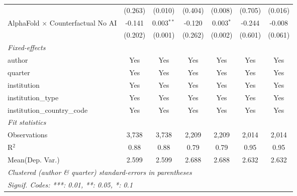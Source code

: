 \begin{tabular}{lcccccc}
                                            & (0.263) & (0.010)        & (0.404) & (0.008)        & (0.705) & (0.016)\\   
   AlphaFold $\times$ Counterfactual No AI  & -0.141  & 0.003$^{**}$   & -0.120  & 0.003$^{*}$    & -0.244  & -0.008\\   
                                            & (0.202) & (0.001)        & (0.262) & (0.002)        & (0.601) & (0.061)\\   
   \midrule
   \emph{Fixed-effects}\\
   author                                   & Yes     & Yes            & Yes     & Yes            & Yes     & Yes\\  
   quarter                                  & Yes     & Yes            & Yes     & Yes            & Yes     & Yes\\  
   institution                              & Yes     & Yes            & Yes     & Yes            & Yes     & Yes\\  
   institution\_type                        & Yes     & Yes            & Yes     & Yes            & Yes     & Yes\\  
   institution\_country\_code               & Yes     & Yes            & Yes     & Yes            & Yes     & Yes\\  
   \midrule
   \emph{Fit statistics}\\
   Observations                             & 3,738   & 3,738          & 2,209   & 2,209          & 2,014   & 2,014\\  
   R$^2$                                    & 0.88    & 0.88           & 0.79    & 0.79           & 0.95    & 0.95\\  
Mean(Dep. Var.) & 2.599 & 2.599 & 2.688 & 2.688 & 2.632 & 2.632 \\
   \midrule \midrule
   \multicolumn{7}{l}{\emph{Clustered (author \& quarter) standard-errors in parentheses}}\\
   \multicolumn{7}{l}{\emph{Signif. Codes: ***: 0.01, **: 0.05, *: 0.1}}\\
\end{tabular}
\par\endgroup

